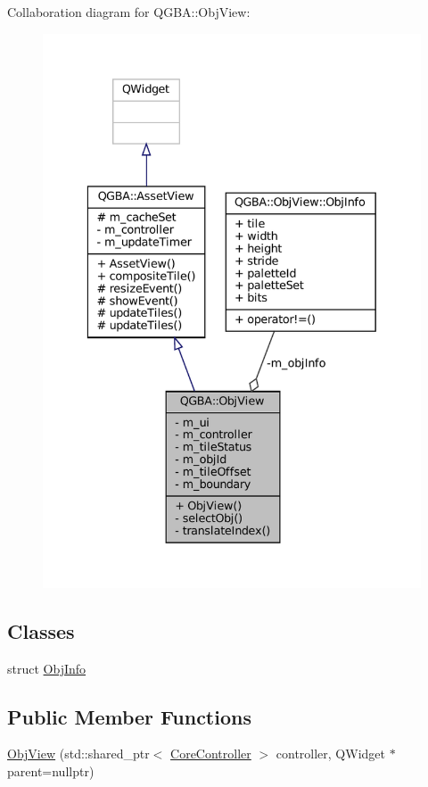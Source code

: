 Collaboration diagram for Q\+G\+BA\+:\+:Obj\+View\+:
\nopagebreak
\begin{figure}[H]
\begin{center}
\leavevmode
\includegraphics[width=336pt]{class_q_g_b_a_1_1_obj_view__coll__graph}
\end{center}
\end{figure}
\subsection*{Classes}
\begin{DoxyCompactItemize}
\item 
struct \mbox{\hyperlink{struct_q_g_b_a_1_1_obj_view_1_1_obj_info}{Obj\+Info}}
\end{DoxyCompactItemize}
\subsection*{Public Member Functions}
\begin{DoxyCompactItemize}
\item 
\mbox{\hyperlink{class_q_g_b_a_1_1_obj_view_a02123485e97e65030618bbca511808b7}{Obj\+View}} (std\+::shared\+\_\+ptr$<$ \mbox{\hyperlink{class_q_g_b_a_1_1_core_controller}{Core\+Controller}} $>$ controller, Q\+Widget $\ast$parent=nullptr)
\end{DoxyCompactItemize}
